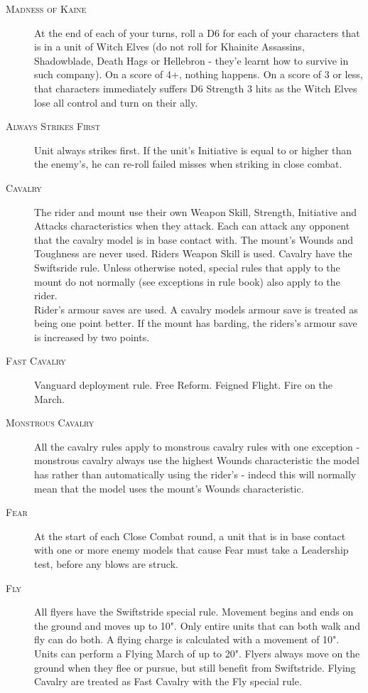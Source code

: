 \begin{description}
\item[\textsc{Madness of Kaine}]\label{rule:madnessofkhaine} At the end of each of your turns, roll a D6 for each of your characters that is in a unit of Witch Elves (do not roll for Khainite Assassins, Shadowblade, Death Hags or Hellebron - they'e learnt how to survive in such company). On a score of 4+, nothing happens. On a score of 3 or less, that characters immediately suffers D6 Strength 3 hits as the Witch Elves lose all control and turn on their ally. 

\item[\textsc{Always Strikes First}]\label{rule:alwaysstrikesfirst} Unit always strikes first. If the unit's Initiative is equal to or higher than the enemy's, he can re-roll failed misses when striking in close combat.
\item[\textsc{Cavalry}]\label{rule:cavalry} The rider and mount use their own Weapon Skill, Strength, Initiative and Attacks characteristics when they attack. Each can attack any opponent that the cavalry model is in base contact with. The mount's Wounds and Toughness are never used. Riders Weapon Skill is used. Cavalry have the Swiftsride rule.\hyperref[rule:swiftstride]{} Unless otherwise noted, special rules that apply to the mount do not normally (see exceptions in rule book) also apply to the rider. \\ Rider's armour saves are used. A cavalry models armour save is treated as being one point better. If the mount has barding, the riders's armour save is increased by two points.
\item[\textsc{Fast Cavalry}]\label{rule:fastcavalry} Vanguard deployment rule. Free Reform. Feigned Flight. Fire on the March. 
\item[\textsc{Monstrous Cavalry}]\label{rule:mostrouscavalry} All the cavalry rules apply to monstrous cavalry rules with one exception - monstrous cavalry always use the highest Wounds characteristic the model has rather than automatically using the rider's - indecd this will normally mean that the model uses the mount's Wounds characteristic.
\item[\textsc{Fear}]\label{rule:fear} At the start of each Close Combat round, a unit that is in base contact with one or more enemy models that cause Fear must take a Leadership test, before any blows are struck. 
\item[\textsc{Fly}]\label{rule:fly} All flyers have the Swiftstride\hyperref[rule:swiftstride]{\dragon} special rule. Movement begins and ends on the ground and moves up to 10". Only entire units that can both walk and fly can do both. A flying charge is calculated with a movement of 10". Units can perform a Flying March of up to 20". Flyers always move on the ground when they flee or pursue, but still benefit from Swiftstride. Flying Cavalry are treated as Fast Cavalry with the Fly special rule.

\end{description}
